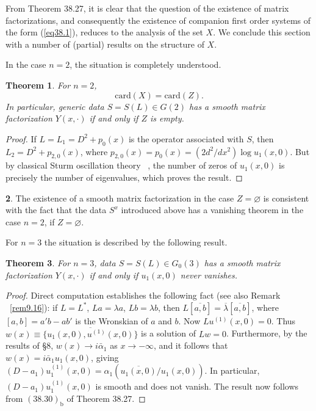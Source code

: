 \documentclass{surv-l}
\theoremstyle{plain}
\newtheorem{theorem}{Theorem}[section]
\theoremstyle{definition}
\newtheorem{remark}[theorem]{\sc{Remark}}
\numberwithin{equation}{chapter}
\begin{document}
From Theorem 38.27, it is clear that the question of the existence of matrix factorizations, and consequently the existence of companion first order systems of the form (\ref{eq38.1}), reduces to the analysis of the set $X$. We conclude this section with a number of (partial) results on the structure of $X$.

In the case $n=2$, the situation is completely understood.

\begin{theorem}\label{thm38.45} For $n=2$,
\begin{equation*}
\mathrm{card}(X) = \mathrm{card} (Z).
\end{equation*}
In particular, generic data $S=S(L)\in G(2)$ has a smooth matrix factorization $Y(x,\cdot)$ if and only if $Z$ is empty.
\end{theorem}

\begin{proof} If $L=L_{1}=D^{2}+p_{0}(x)$ is the operator associated with $S$, then $L_{2}=D^{2}+p_{2,0}(x)$, where $p_{2,0}(x)=p_{0}(x)=(2d^{2}/dx^{2})\log u_{1}(x, 0)$. But by classical Sturm oscillation theory ~\cite{CL}, the number of zeros of $u_{1}(x, 0)$ is precisely the number of eigenvalues, which proves the result.
\end{proof}

\begin{remark}\label{rem38.46} The existence of a smooth matrix factorization in the case $ Z=\varnothing$ is consistent with the fact that the data $S^{x}$ introduced above has a vanishing theorem in the case $n=2$, if $ Z=\varnothing$.

For $n=3$ the situation is described by the following result.
\end{remark}

\begin{theorem}\label{thm38.47}  For $n=3$, data $S=S(L)\in G_{0}(3)$ has a smooth matrix factorization $Y(x, \cdot)$ if and only if $u_{1}(x,0)$ never vanishes.
\end{theorem}

\begin{proof}  Direct computation establishes the following fact (see also Remark ~\ref{rem9.16}): if $L=L^{*}$, $La=\lambda a$, $Lb=\lambda b$, then $L[\overline{a,b}]=\overline{\lambda}[\overline{a,b}]$, where $[a,b]=a'b-ab'$ is the Wronskian of $a$ and $b$. Now $Lu^{(1)} (x, 0)=0$. Thus $ w(x)\equiv \{\overline{u_{1}(x,0),u^{(1)}(x,0)}\}$ is a solution of $Lw=0$. Furthermore, by the results of \S 8, $w(x)\rightarrow i\bar{\alpha}_{1}$ as $ x\rightarrow-\infty$, and it follows that $w(x)=i\bar{\alpha}_{1}u_{1}(x,0)$, giving $(D-a_{1})u_{1}^{(1)}(x,0)=\alpha_{1}(\overline{u_{1}(x,0)}/u_{1}(x,0))$. In particular, $(D-a_{1})u_{1}^{(1)}(x,0)$ is smooth and does not vanish. The result now follows from $(38.30)_{\mathrm{b}}$ of Theorem 38.27.
\end{proof}
\end{document}

